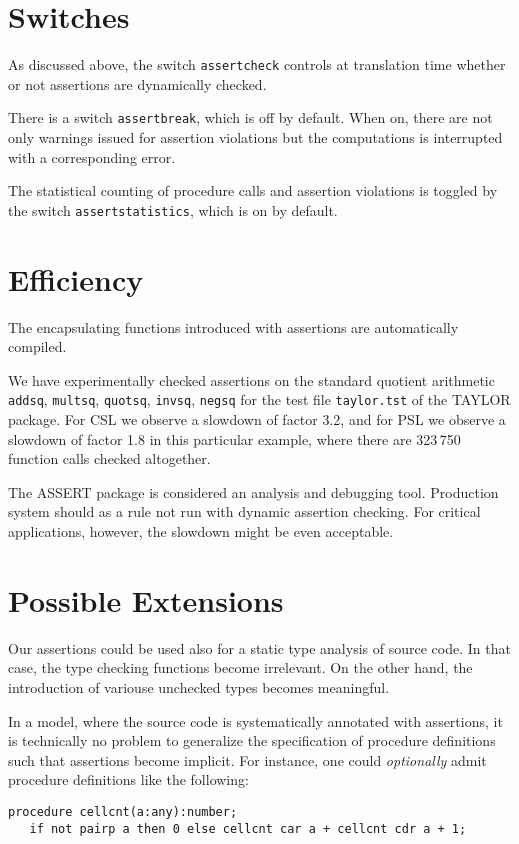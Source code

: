 \documentclass{article}
\begin{document}
\section{Switches}
As discussed above, the switch \texttt{assertcheck} controls at
translation time whether or not assertions are dynamically checked.

There is a switch \texttt{assertbreak}, which is off by default. When
on, there are not only warnings issued for assertion violations but the
computations is interrupted with a corresponding error.

The statistical counting of procedure calls and assertion violations is
toggled by the switch \texttt{assertstatistics}, which is on by default.

\section{Efficiency}
The encapsulating functions introduced with assertions are automatically
compiled.






We have experimentally checked assertions on the standard quotient
arithmetic \texttt{addsq}, \texttt{multsq}, \texttt{quotsq},
\texttt{invsq}, \texttt{negsq} for the test file \texttt{taylor.tst} of
the TAYLOR package. For CSL we observe a slowdown of factor 3.2, and for
PSL we observe a slowdown of factor 1.8 in this particular example,
where there are 323\,750 function calls checked altogether.

The ASSERT package is considered an analysis and debugging tool.
Production system should as a rule not run with dynamic assertion
checking. For critical applications, however, the slowdown might be
even acceptable.

\section{Possible Extensions}
Our assertions could be used also for a static type analysis of source
code. In that case, the type checking functions become irrelevant. On
the other hand, the introduction of variouse unchecked types becomes
meaningful.

In a model, where the source code is systematically annotated with
assertions, it is technically no problem to generalize the specification
of procedure definitions such that assertions become implicit. For
instance, one could \emph{optionally} admit procedure definitions like
the following:
\begin{verbatim}
procedure cellcnt(a:any):number;
   if not pairp a then 0 else cellcnt car a + cellcnt cdr a + 1;
\end{verbatim}
\end{document}
